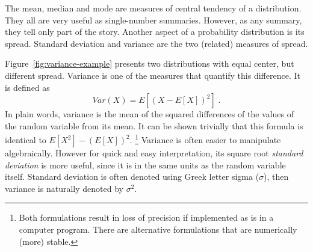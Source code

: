 The mean, median and mode are measures of central tendency of a distribution.
They all are very useful as single-number summaries.
However, as any summary,
they tell only part of the story.
Another aspect of a probability distribution is its spread.
Standard deviation and variance are the two (related) measures of spread. 
\begin{marginfigure}
  \caption{\label{fig:variance-example}%
    Two probability distributions with the same \emph{mean},
    \emph{median} and \emph{mode},
    but different \emph{variances}.
    More precisely,
    both distributions are Gaussian distributions with $\mu=0$,
    and $\sigma=0.7$ (narrow, blue) and $\sigma=1.3$ (wide, orange).
  }
\end{marginfigure}
Figure~\ref{fig:variance-example} presents two distributions with equal center,
but different spread.
Variance is one of the measures that quantify this difference.
It is defined as
\[
  Var(X) = E[(X - E[X])^{2}]\;.
\]
In plain words, variance is the mean of the squared differences
of the values of the random variable from its mean.
It can be shown trivially that this formula is identical to
$E[X^{2}] - (E[X])^{2}$.%
\footnote{%
  Both formulations result in loss of precision
  if implemented as is in a computer program.
  There are alternative formulations that are numerically (more) stable.
}
Variance is often easier to manipulate algebraically.
However for quick and easy interpretation,
its square root \emph{standard deviation} is more useful,
since it is in the same units as the random variable itself.
Standard deviation is often denoted using Greek letter sigma ($\sigma$),
then variance is naturally denoted by $\sigma^{2}$.

